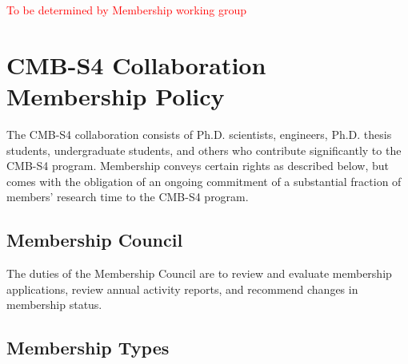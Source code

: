 
\textcolor{red}{To be determined by Membership working group}


\section{CMB-S4 Collaboration Membership Policy}

The CMB-S4 collaboration consists of Ph.D. scientists, engineers, Ph.D. thesis students, undergraduate students, and others who contribute significantly to the CMB-S4 program. Membership conveys certain rights as described below, but comes with the obligation of an ongoing commitment of a substantial fraction of members' research time to the CMB-S4 program.

\vspace{0.2in}
\noindent


\subsection{Membership Council}

The duties of the Membership Council are to review and evaluate membership applications, review annual activity reports, and recommend changes in membership status. 

\subsection{Membership Types}

